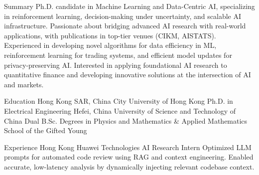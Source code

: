 \documentclass[caps, english]{financecv}
\begin{document}
\begin{cvsection}{Summary}
    Ph.D. candidate in Machine Learning and Data-Centric AI, specializing in reinforcement learning, decision-making under uncertainty, and scalable AI infrastructure. Passionate about bridging advanced AI research with real-world applications, with publications in top-tier venues (CIKM, AISTATS). Experienced in developing novel algorithms for data efficiency in ML, reinforcement learning for trading systems, and efficient model updates for privacy-preserving AI. Interested in applying foundational AI research to quantitative finance and developing innovative solutions at the intersection of AI and markets.
\end{cvsection}

\begin{cvsection}{Education}
    {Hong Kong SAR, China}
    {City University of Hong Kong}
    {}
    {Ph.D. in Electrical Engineering}
    {}
    {}
    {}
    {Hefei, China}
    {University of Science and Technology of China}
    {}
    {Dual B.Sc. Degrees in Physics and Mathematics \& Applied Mathematics}
    {School of the Gifted Young}
    {}
    {}
\end{cvsection}

\begin{cvsection}{Experience}
    {Hong Kong}
    {Huawei Technologies}
    {AI Research Intern}
    {Optimized LLM prompts for automated code review using RAG and context engineering. Enabled accurate, low-latency analysis by dynamically injecting relevant codebase context.}
    {}
    {}
    {}
\end{cvsection}
\end{document}
